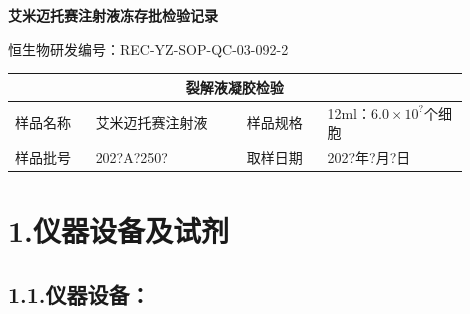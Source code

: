 \documentclass[UTF8,10pt,a4paper,fontset=fandol]{ctexart}
\newcommand{\fieldvalue}[1]{#1}
\newcommand{\handwritten}[1]{#1}
\begin{document}
\begin{center}
{\Large\textbf{艾米迈托赛注射液冻存批检验记录}}
\end{center}

\begin{flushright}
恒生物研发编号：REC-YZ-SOP-QC-03-092-2
\end{flushright}

\begin{center}
\begin{tabular}{|p{0.16\linewidth}|p{0.30\linewidth}|p{0.16\linewidth}|p{0.28\linewidth}|}
\hline
\multicolumn{4}{|c|}{裂解液凝胶检验}\\
\hline
样品名称 &
\fieldvalue{艾米迈托赛注射液} &
样品规格 &
\fieldvalue{12ml：$6.0\times10^{?}$个细胞}\\
\hline
样品批号 &
\fieldvalue{\handwritten{202?A?250?}} &
取样日期 &
\fieldvalue{\handwritten{202?年?月?日}}\\
\hline
\end{tabular}
\end{center}

\section*{1.\quad 仪器设备及试剂}

\subsection*{1.1.\quad 仪器设备：}
\end{document}
